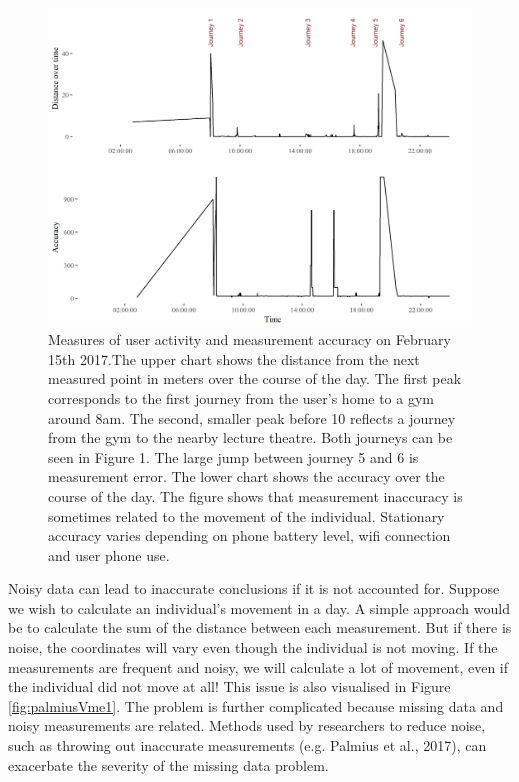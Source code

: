 \documentclass[man]{apa6}
\theoremstyle{definition}
\theoremstyle{definition}
\theoremstyle{definition}
\theoremstyle{remark}
\begin{document}
\begin{figure}
\includegraphics[width=1\linewidth]{img/accuracyLocShift} \caption{Measures of user activity and measurement accuracy on February 15th 2017.The upper chart shows the distance from the next measured point in meters over the course of the day. The first peak corresponds to the first journey from the user's home to a gym around 8am. The second, smaller peak before 10 reflects a journey from the gym to the nearby lecture theatre. Both journeys can be seen in Figure 1. The large jump between journey 5 and 6 is measurement error. The lower chart shows the accuracy over the course of the day. The figure shows that measurement inaccuracy is sometimes related to the movement of the individual. Stationary accuracy varies depending on phone battery level, wifi connection and user phone use.}\label{fig:accuracyPlot2}
\end{figure}

Noisy data can lead to inaccurate conclusions if it is not accounted
for. Suppose we wish to calculate an individual's movement in a day. A
simple approach would be to calculate the sum of the distance between
each measurement. But if there is noise, the coordinates will vary even
though the individual is not moving. If the measurements are frequent
and noisy, we will calculate a lot of movement, even if the individual
did not move at all! This issue is also visualised in Figure
\ref{fig:palmiusVme1}. The problem is further complicated because
missing data and noisy measurements are related. Methods used by
researchers to reduce noise, such as throwing out inaccurate
measurements (e.g. Palmius et al., 2017), can exacerbate the severity of
the missing data problem.
\end{document}
